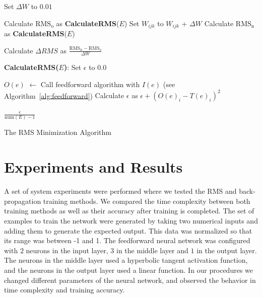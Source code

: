 \documentclass[11pt]{article}
\begin{document}
\begin{algorithm}%
\dontprintsemicolon
{}
Set $\Delta W$ to $0.01$\;
\SetLine
{}
{
	{
		{
				{
					Calculate $\mbox{RMS}_{\mbox{o}}$ as \textbf{CalculateRMS}($E$)\;
					Set $W_{ijk}$ to $W_{ijk}$ + $\Delta W$\;
					Calculate $\mbox{RMS}_{\mbox{n}}$ as \textbf{CalculateRMS}($E$)\;
				
					Calculate $\Delta RMS$ as $ \frac{\mbox{RMS}_{\mbox{n}}-\mbox{RMS}_{\mbox{o}}}{\Delta W} $\;
				
				}
		}
	}
}

\textbf{CalculateRMS($E$)}:
\dontprintsemicolon
{} 
Set $\epsilon$ to $0.0$\;
{
	$O(e)$ $\leftarrow$  Call feedforward algorithm with $I(e)$ (see Algorithm~\ref{alg:feedforward})\;
	{
		Calculate $\epsilon$ as $\epsilon + (O(e)_{i} - T(e)_{i})^{2}$\;
	} 
	
}
\Return $\frac{\epsilon}{\mbox{num}(E) - 1}$ 
\vspace{5mm}
\caption{The RMS Minimization Algorithm}
\label{alg:RMSminimization}
\end{algorithm}




\section{Experiments and Results} %
\label{sec:results}

A set of system experiments were performed where we tested the RMS and back-propagation training methods. We compared the time
complexity between both training methods as well as their accuracy after training is completed. The set of examples to train the network
were generated by taking two numerical inputs and adding them to generate the expected output. This data was normalized so that its
range was between -1 and 1. The feedforward neural network was configured with $2$ neurons in the input layer, $3$ in the middle layer
and $1$ in the output layer. The neurons in the middle layer used a hyperbolic tangent activation function, and the neurons in the
output layer used a linear function. In our procedures we changed different parameters of the neural network, and observed the behavior
in time complexity and training accuracy.
\end{document}
